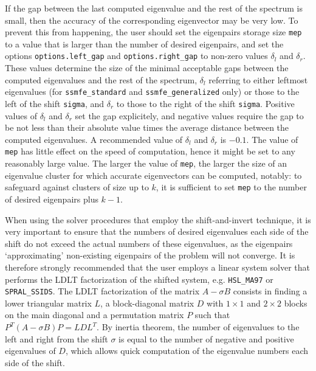 If the gap %
between the last computed eigenvalue 
and the rest of the spectrum is small,
then the accuracy of the corresponding eigenvector may be very low.
To prevent this from happening,
the user should set the eigenpairs storage size {\tt mep}
to a value that is larger than the number of desired eigenpairs,
and set the options 
{\tt options.left\_gap}
and
{\tt options.right\_gap}
to non-zero values $\delta_l$ and $\delta_r$.
These values
determine the size of the minimal acceptable gaps
between the computed eigenvalues and the rest of the spectrum,
$\delta_l$ referring to either leftmost eigenvalues
(for {\tt ssmfe\_standard} and {\tt ssmfe\_generalized} only)
or those to the left of the shift {\tt sigma},
and $\delta_r$
to those to the right of the shift {\tt sigma}.
Positive values of $\delta_l$ and $\delta_r$
set the gap explicitely,
and negative values
require the gap to be not less than their absolute value times
the average distance between the computed eigenvalues.
A recommended value of $\delta_l$ and $\delta_r$ is $-0.1$.
The value of {\tt mep} %
has little effect on
the speed of computation,
hence it might be set to any reasonably large value.
The larger the value of {\tt mep}, 
the larger the size of an eigenvalue cluster
for which accurate eigenvectors can be computed, notably:
to safeguard against clusters of size up to $k$,
it is sufficient to set {\tt mep} to the number of desired eigenpairs
plus $k - 1$.

When using the solver procedures that employ the shift-and-invert technique,
it is very important to ensure that the numbers of desired eigenvalues
each side of the shift do not exceed the actual numbers of these eigenvalues,
as the eigenpairs `approximating' non-existing eigenpairs of the problem
will not converge.
It is therefore strongly recommended that the user employs 
a linear system solver that performs
the LDLT
factorization of %
the shifted system,
e.g. {\tt HSL\_MA97} or {\tt SPRAL\_SSIDS}.
The LDLT factorization of the matrix
$A - \sigma B$ consists in finding a lower triangular
matrix $L$, a block-diagonal matrix $D$
with $1\times 1$ and $2\times 2$ blocks on the main diagonal
and a permutation matrix $P$
such that $P^T(A - \sigma B)P = L D L^T$.
By inertia theorem,
the number of eigenvalues to the left and right from 
the shift $\sigma$
is equal to the number of negative and positive eigenvalues of $D$,
which allows quick computation of the eigenvalue numbers
each side of the shift. %

